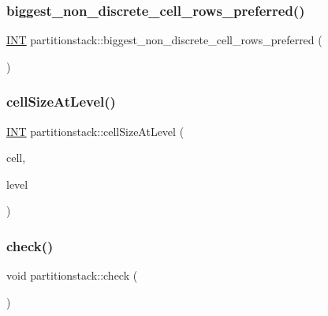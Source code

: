 \subsubsection{\texorpdfstring{biggest\+\_\+non\+\_\+discrete\+\_\+cell\+\_\+rows\+\_\+preferred()}{biggest\_non\_discrete\_cell\_rows\_preferred()}}
{\footnotesize\ttfamily \mbox{\hyperlink{galois_8h_a09fddde158a3a20bd2dcadb609de11dc}{I\+NT}} partitionstack\+::biggest\+\_\+non\+\_\+discrete\+\_\+cell\+\_\+rows\+\_\+preferred (\begin{DoxyParamCaption}{ }\end{DoxyParamCaption})}

\mbox{\label{classpartitionstack_a45dbe0a5e1542ef41bf548c619da17b3}} 
\subsubsection{\texorpdfstring{cell\+Size\+At\+Level()}{cellSizeAtLevel()}}
{\footnotesize\ttfamily \mbox{\hyperlink{galois_8h_a09fddde158a3a20bd2dcadb609de11dc}{I\+NT}} partitionstack\+::cell\+Size\+At\+Level (\begin{DoxyParamCaption}\item[{\mbox{\hyperlink{galois_8h_a09fddde158a3a20bd2dcadb609de11dc}{I\+NT}}}]{cell,  }\item[{\mbox{\hyperlink{galois_8h_a09fddde158a3a20bd2dcadb609de11dc}{I\+NT}}}]{level }\end{DoxyParamCaption})}

\mbox{\label{classpartitionstack_a30ab45463af6dbfc8e46314ff03624ae}} 
\subsubsection{\texorpdfstring{check()}{check()}}
{\footnotesize\ttfamily void partitionstack\+::check (\begin{DoxyParamCaption}{ }\end{DoxyParamCaption})}

\mbox{\label{classpartitionstack_a40d83b004c2f2312d231de8bab671ebb}} 
